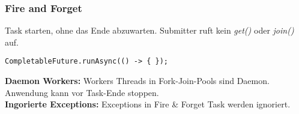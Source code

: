 \subsubsection{Fire and Forget}
Task starten, ohne das Ende abzuwarten. Submitter ruft kein \textit{get()} oder \textit{join()} auf.
\begin{lstlisting}
CompletableFuture.runAsync(() -> { });
\end{lstlisting}
\textbf{Daemon Workers:} Workers Threads in Fork-Join-Pools sind Daemon.
Anwendung kann vor Task-Ende stoppen.\\ 
\textbf{Ingorierte Exceptions:} Exceptions in Fire \& Forget Task werden ignoriert.
